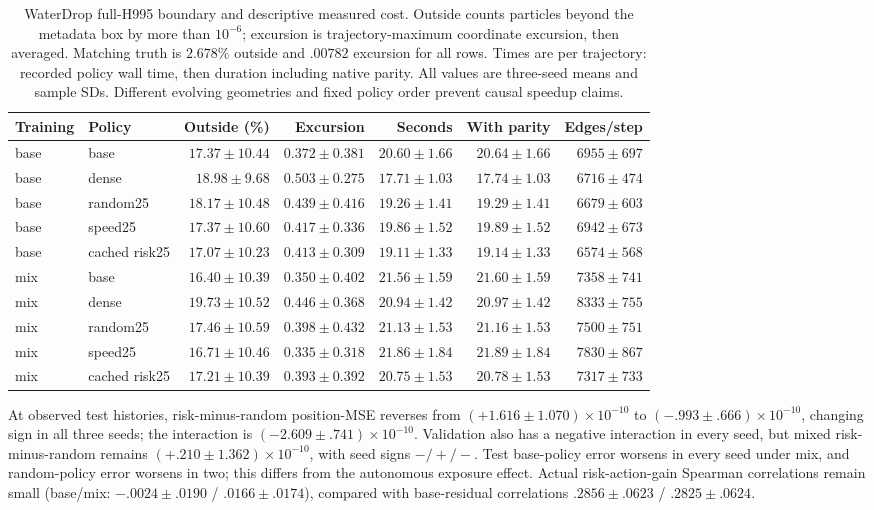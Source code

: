 \begin{table}[p]\centering\scriptsize
\caption{WaterDrop full-H995 boundary and descriptive measured cost. Outside counts particles beyond the metadata box by more than $10^{-6}$; excursion is trajectory-maximum coordinate excursion, then averaged. Matching truth is $2.678\%$ outside and $.00782$ excursion for all rows. Times are per trajectory: recorded policy wall time, then duration including native parity. All values are three-seed means and sample SDs. Different evolving geometries and fixed policy order prevent causal speedup claims.}
\label{tab:waterdrop110k-cost}
\begin{tabular}{llrrrrr}\toprule
Training & Policy & Outside (\%) & Excursion & Seconds & With parity & Edges/step\\\midrule
base & base & $17.37\pm10.44$ & $0.372\pm0.381$ & $20.60\pm1.66$ & $20.64\pm1.66$ & $6955\pm697$\\
base & dense & $18.98\pm9.68$ & $0.503\pm0.275$ & $17.71\pm1.03$ & $17.74\pm1.03$ & $6716\pm474$\\
base & random25 & $18.17\pm10.48$ & $0.439\pm0.416$ & $19.26\pm1.41$ & $19.29\pm1.41$ & $6679\pm603$\\
base & speed25 & $17.37\pm10.60$ & $0.417\pm0.336$ & $19.86\pm1.52$ & $19.89\pm1.52$ & $6942\pm673$\\
base & cached risk25 & $17.07\pm10.23$ & $0.413\pm0.309$ & $19.11\pm1.33$ & $19.14\pm1.33$ & $6574\pm568$\\
mix & base & $16.40\pm10.39$ & $0.350\pm0.402$ & $21.56\pm1.59$ & $21.60\pm1.59$ & $7358\pm741$\\
mix & dense & $19.73\pm10.52$ & $0.446\pm0.368$ & $20.94\pm1.42$ & $20.97\pm1.42$ & $8333\pm755$\\
mix & random25 & $17.46\pm10.59$ & $0.398\pm0.432$ & $21.13\pm1.53$ & $21.16\pm1.53$ & $7500\pm751$\\
mix & speed25 & $16.71\pm10.46$ & $0.335\pm0.318$ & $21.86\pm1.84$ & $21.89\pm1.84$ & $7830\pm867$\\
mix & cached risk25 & $17.21\pm10.39$ & $0.393\pm0.392$ & $20.75\pm1.53$ & $20.78\pm1.53$ & $7317\pm733$\\
\bottomrule\end{tabular}\end{table}

At observed test histories, risk-minus-random position-MSE reverses from $(+1.616\pm1.070)\times10^{-10}$ to $(-.993\pm.666)\times10^{-10}$, changing sign in all three seeds; the interaction is $(-2.609\pm.741)\times10^{-10}$. Validation also has a negative interaction in every seed, but mixed risk-minus-random remains $(+.210\pm1.362)\times10^{-10}$, with seed signs $-/+/-$. Test base-policy error worsens in every seed under mix, and random-policy error worsens in two; this differs from the autonomous exposure effect. Actual risk-action-gain Spearman correlations remain small (base/mix: $-.0024\pm.0190$ / $.0166\pm.0174$), compared with base-residual correlations $.2856\pm.0623$ / $.2825\pm.0624$.

